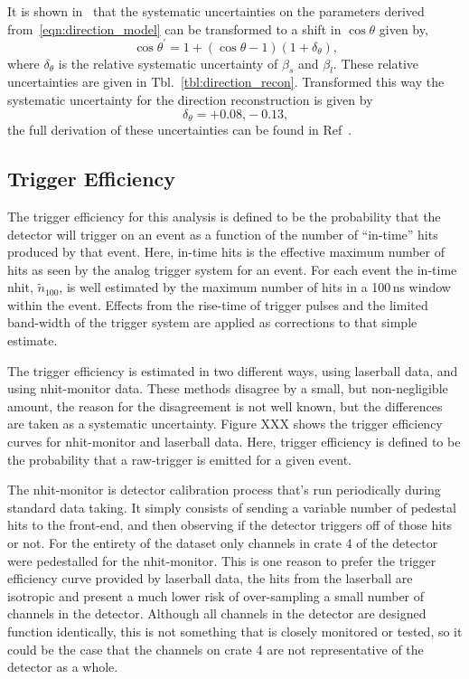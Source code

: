It is shown in~\citep{pierre_luc_thesis} that the systematic uncertainties on the
parameters derived from~\eqref{eqn:direction_model} can be transformed to a shift
in $\cos\theta$ given by,
\begin{equation}
    \cos\theta^{\prime} = 1+(\cos\theta-1)(1+\delta_{\theta})\text{,}
\end{equation}
where $\delta_{\theta}$ is the relative systematic uncertainty of $\beta_{s}$ and $\beta_{l}$.
These relative uncertainties are given in Tbl.~\ref{tbl:direction_recon}.
Transformed this way the systematic uncertainty for the direction reconstruction
is given by
\begin{equation*}
    \delta_{\theta} = +0.08\text{,} -0.13\text{,}
\end{equation*}
the full derivation of these uncertainties can be found in Ref~\citep{snop_water_unidoc}.

\subsection{Trigger Efficiency}
The trigger efficiency for this analysis is defined to be the probability that
the detector will trigger on an event as a function of the number of ``in-time''
hits produced by that event.
Here, in-time hits is the effective maximum number of hits as seen by the analog
trigger system for an event.
For each event the in-time nhit, $\tilde{n}_{100}$, is well
estimated by the maximum number of hits in a 100\,ns window within the event.
Effects from the rise-time of trigger pulses and the limited band-width of the
trigger system are applied as corrections to that simple estimate.

The trigger efficiency is estimated in two different ways, using laserball
data, and using nhit-monitor data.
These methods disagree by a small, but non-negligible amount, the
reason for the disagreement is not well known, but the differences are taken
as a systematic uncertainty. Figure XXX shows the trigger efficiency curves
for nhit-monitor and laserball data.
Here, trigger efficiency is defined to be the probability that a raw-trigger
is emitted for a given event.

The nhit-monitor is detector calibration  process that's run periodically during
standard data taking. It simply consists of sending a variable number
of pedestal hits to the front-end, and then observing if the detector triggers
off of those hits or not. For the entirety of the dataset only channels in
crate 4 of the detector were pedestalled for the nhit-monitor.
This is one reason to prefer the trigger efficiency curve provided by laserball
data, the hits from the laserball are isotropic and present a much lower risk of
over-sampling a small number of channels in the detector. Although all channels
in the detector are designed function identically, this is not something that
is closely monitored or tested, so it could be the case that the channels on
crate 4 are not representative of the detector as a whole.

